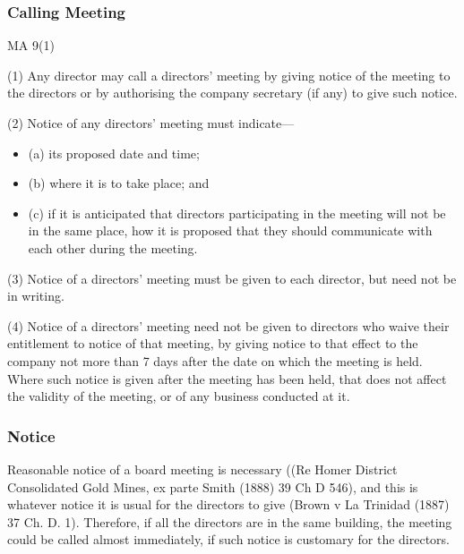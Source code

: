 \documentclass[
]{article}
\providecommand{\tightlist}{%
  \setlength{\itemsep}{0pt}\setlength{\parskip}{0pt}}
\newenvironment{env-12fb5320-b8eb-47b6-8035-097e16242c42}
{
    \savenotes\tcolorbox[blanker,breakable,left=5pt,borderline west={2pt}{-4pt}{green}]
}
{
    \endtcolorbox\spewnotes
}
\begin{document}
\hypertarget{calling-meeting}{%
\subsubsection{Calling Meeting}\label{calling-meeting}}

\begin{env-12fb5320-b8eb-47b6-8035-097e16242c42}

MA 9(1)

(1) Any director may call a directors' meeting by giving notice of the
meeting to the directors or by authorising the company secretary (if
any) to give such notice.

(2) Notice of any directors' meeting must indicate---

\begin{itemize}
\tightlist
\item
  (a) its proposed date and time;
\item
  (b) where it is to take place; and
\item
  (c) if it is anticipated that directors participating in the meeting
  will not be in the same place, how it is proposed that they should
  communicate with each other during the meeting.
\end{itemize}

(3) Notice of a directors' meeting must be given to each director, but
need not be in writing.

(4) Notice of a directors' meeting need not be given to directors who
waive their entitlement to notice of that meeting, by giving notice to
that effect to the company not more than 7 days after the date on which
the meeting is held. Where such notice is given after the meeting has
been held, that does not affect the validity of the meeting, or of any
business conducted at it.

\end{env-12fb5320-b8eb-47b6-8035-097e16242c42}

\hypertarget{notice}{%
\subsubsection{Notice}\label{notice}}

Reasonable notice of a board meeting is necessary ((Re Homer District
Consolidated Gold Mines, ex parte Smith (1888) 39 Ch D 546), and this is
whatever notice it is usual for the directors to give (Brown v La
Trinidad (1887) 37 Ch. D. 1). Therefore, if all the directors are in the
same building, the meeting could be called almost immediately, if such
notice is customary for the directors.
\end{document}
